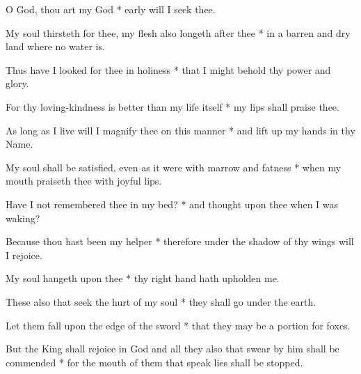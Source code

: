 O God, thou art my God * early will I seek thee.

My soul thirsteth for thee, my flesh also longeth after thee * in a barren and dry land where no water is.

Thus have I looked for thee in holiness * that I might behold thy power and glory.

For thy loving-kindness is better than my life itself * my lips shall praise thee.

As long as I live will I magnify thee on this manner * and lift up my hands in thy Name.

My soul shall be satisfied, even as it were with marrow and fatness * when my mouth praiseth thee with joyful lips.

Have I not remembered thee in my bed? * and thought upon thee when I was waking?

Because thou hast been my helper * therefore under the shadow of thy wings will I rejoice.

My soul hangeth upon thee * thy right hand hath upholden me.

These also that seek the hurt of my soul * they shall go under the earth.

Let them fall upon the edge of the sword * that they may be a portion for foxes.

But the King shall rejoice in God and all they also that swear by him shall be commended * for the mouth of them that speak lies shall be stopped.